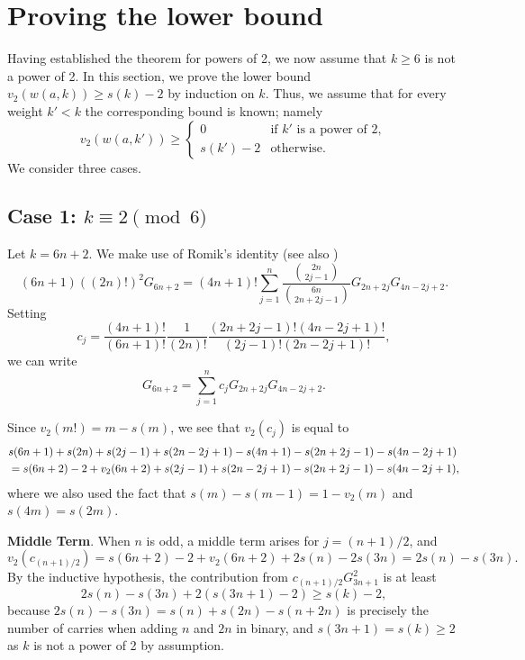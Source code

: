 \documentclass[12pt]{amsart}
\begin{document}
\section{Proving the lower bound}
Having established the theorem for powers of 2, we now assume that $k \ge 6$ is not a power of 2. In this section, we prove the lower bound $v_2(w(a,k))\ge s(k)-2$ by induction on $k$. Thus, we assume that for every weight $k'<k$ the corresponding bound is known; namely
\[ 
v_2(w(a,k'))\ge
\begin{cases}
0 & \text{if $k'$ is a power of \(2\)},\\
s(k')-2 & \text{otherwise}.
\end{cases}
\]
We consider three cases. 

\subsection{Case 1: \texorpdfstring{$k \equiv 2 \pmod 6$}{k=2(mod6)}}

Let $k = 6n+2$. We make use of Romik's identity \cite[Theorem 1.6]{Romik} (see also \cite[Theorem 1]{MerRol})
\[
(6n+1) ((2n)!)^2 G_{6n+2} = (4n+1)! \sum_{j=1}^n \frac{\binom{2n}{2j-1}}{\binom{6n}{2n+2j-1}} G_{2n+2j} G_{4n-2j+2}.
\]
Setting
\[ c_j = \frac{(4n+1)!}{(6n+1)!} \frac{1}{(2n)!} \frac{(2n+2j-1)!(4n-2j+1)!}{(2j-1)!(2n-2j+1)!},\] we can write
\[ G_{6n+2}=\sum_{j=1}^n c_j G_{2n+2j}G_{4n-2j+2}.\] 

Since $v_2(m!) = m - s(m)$, we see that $v_2(c_j)$ is equal to
\begin{align*}
 & s(6n+1) + s(2n) + s(2j-1) + s(2n-2j+1) - s(4n+1) - s(2n+2j-1) - s(4n-2j+1) \notag \\
&=s(6n+2) -2 +v_2(6n+2) + s(2j-1) + s(2n-2j+1) - s(2n+2j-1) - s(4n-2j+1), \notag
\end{align*}
where we also used the fact that $s(m) -s(m-1)= 1-v_2(m)$ and $s(4m) = s(2m)$.

\bigskip

\noindent \textbf{Middle Term}. When $n$ is odd, a middle term arises for $j=(n+1)/2$, and
\[ v_2(c_{(n+1)/2})=s(6n+2)-2+v_2(6n+2)+2s(n)-2s(3n)=2s(n)-s(3n).\] By the inductive hypothesis, the contribution from $c_{(n+1)/2} G_{3n+1}^2$ is at least 
\[ 2s(n)-s(3n)+2(s(3n+1)-2)\ge s(k)-2,\] because $2s(n)-s(3n)=s(n)+s(2n)-s(n+2n)$ is precisely the number of carries when adding $n$ and $2n$ in binary, and $s(3n+1)=s(k)\ge 2$ as $k$ is not a power of 2 by assumption. 
\end{document}
